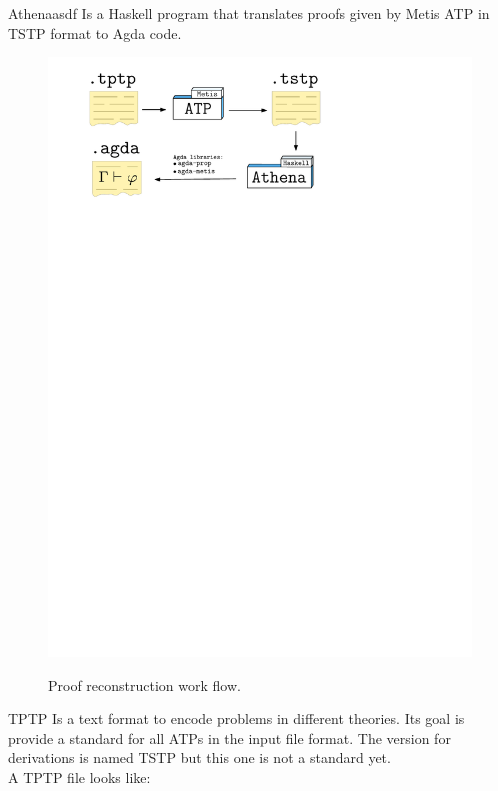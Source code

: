 \begin{frame}{Athena}{asdf}
  Is a Haskell program that translates proofs given by Metis ATP in TSTP format
  to Agda code.

  \begin{figure}
    \includegraphics[scale=0.85]{figures/diagram.pdf}
    \label{im:athena}
    \caption{Proof reconstruction work flow.}
  \end{figure}
\end{frame}

\begin{frame}{TPTP}
  Is a text format to encode problems in different theories. Its goal is provide
  a standard for all ATPs in the input file format. The version for derivations
  is named TSTP but this one is not a standard yet.\\[2mm]

  A TPTP file looks like:


\end{frame}

